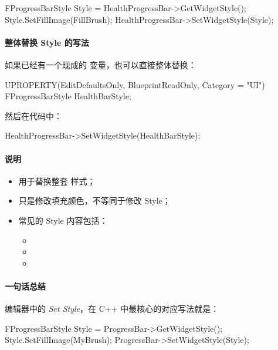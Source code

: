 \begin{code}
	FProgressBarStyle Style = HealthProgressBar->GetWidgetStyle();
	Style.SetFillImage(FillBrush);
	HealthProgressBar->SetWidgetStyle(Style);
\end{code}

\paragraph{整体替换 Style 的写法}

如果已经有一个现成的  变量，也可以直接整体替换：

\begin{code}
	UPROPERTY(EditDefaultsOnly, BlueprintReadOnly, Category = "UI")
	FProgressBarStyle HealthBarStyle;
\end{code}

然后在代码中：

\begin{code}
	HealthProgressBar->SetWidgetStyle(HealthBarStyle);
\end{code}

\paragraph{说明}

\begin{itemize}
	\item {} 用于替换整套  样式；
	\item {} 只是修改填充颜色，不等同于修改 Style；
	\item 常见的 Style 内容包括：
	\begin{itemize}
		\item {}
		\item {}
		\item {}
	\end{itemize}
\end{itemize}

\paragraph{一句话总结}

编辑器中的 \textit{Set Style}，在 C++ 中最核心的对应写法就是：

\begin{code}
	FProgressBarStyle Style = ProgressBar->GetWidgetStyle();
	Style.SetFillImage(MyBrush);
	ProgressBar->SetWidgetStyle(Style);
\end{code}
